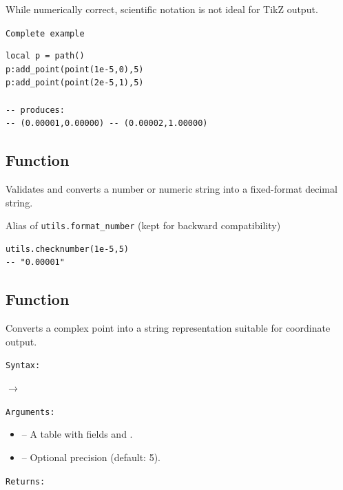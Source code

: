 While numerically correct, scientific notation is not ideal
for TikZ output.


\texttt{Complete example}

\begin{verbatim}
local p = path()
p:add_point(point(1e-5,0),5)
p:add_point(point(2e-5,1),5)

-- produces:
-- (0.00001,0.00000) -- (0.00002,1.00000)
\end{verbatim}





\subsection{Function }
\label{sub:function_utils_checknumber}

Validates and converts a number or numeric string into a fixed-format decimal string.

Alias of \verb|utils.format_number| (kept for backward compatibility)

\begin{verbatim}
utils.checknumber(1e-5,5)
-- "0.00001"
\end{verbatim}




\subsection{Function }
\label{sub:function_utils_format_point}

Converts a complex point into a string representation suitable for coordinate output.

\texttt{Syntax: }

\begin{center}
 \hfill $\rightarrow$ 
\end{center}

\medskip
\texttt{Arguments: }

\begin{itemize}
\item {} – A table with fields  and .
\item {} – Optional precision (default: 5).
\end{itemize}

\medskip
\texttt{Returns: }

